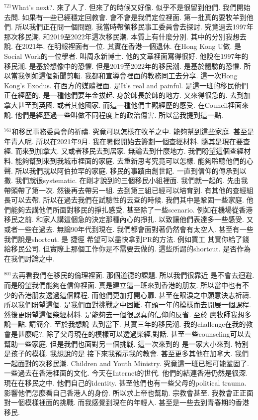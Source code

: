 \documentclass{book}
\begin{document}
$^{721}$What's next?.
來了人了.
但來了的時候又好像.
似乎不是很留到他們.
我們開始去問.
如果有一些已經穩定回教會.
會不會是我們定位裡面.
第一批真的要牧羊到他們.
所以我們正在問一個問題.
我當時帶領移民事工委員會去探討.
究竟過去1997年那次移民潮.
和2019至2022年這次移民潮.
本質上有什麼分別.
其中的分別我想去說.
在2021年.
在明報裡面有一位.
其實在香港一個退休.
在Hong Kong U做.
是Social Work的一位學者.
叫周永新博士.
他的文章裡面寫得很好.
他說在1997年的移民潮.
是基於想像中的恐懼.
但是2019至2022年的移民潮.
是基於體驗的恐懼.
所以當我例如這個新聞剪輯.
我都和宣導會裡面的教務同工去分享.
這一次Hong Kong's Exodus.
在西方的媒體裡面.
是It's real and painful.
是這一班的移民他們正在經歷的.
是一種他們要年金拔起.
身於師長於師的地方.
又來得很急的.
去到加拿大甚至到英國.
或者其他國家.
而這一種他們主觀經歷的感受.
在Council裡面來說.
他們是經歷過一些叫做不同程度上的政治傷害.
所以當我提到這一點.

$^{761}$和移民事務委員會的祈禱.
究竟可以怎樣在牧羊之中.
能夠幫到這些家庭.
甚至是年青人呢.
所以在2021年9月.
我在暑假開始去籌劃一個查經材料.
隨其是現在要查經.
而來到加拿大.
又或者移民去到居家.
無論去到什麼地方.
我們盼望這個查經材料.
能夠幫到來到我城市裡面的家庭.
去重新思考究竟可以怎樣.
能夠聆聽他們的心聲.
所以我們就以阿伯拉罕的家庭.
移民的事蹟由創世記.
一直到信仰的傳承到以撒.
我們就很systematic.
在剛才說到的三個移民小組裡面.
我們就一起的.
先由我帶頭帶了第一次.
然後再去帶另一組.
去到第三組已經可以培育到.
有其他的查經組長可以去帶.
所以在過去我們在試驗性的去查的時候.
我們其中是鞏固一些家庭.
他們能夠去講他們所面對移民的掙扎感受.
甚至除了一些scenario.
例如在機場從香港移民之前.
和家人講這個急的決定那種內心的掙扎.
以致讓他們表達多一些感受.
又或者一些在過去.
無論90年代到現在.
我們都會面對著仍然會有太空人.
甚至有一些我們說是shortcut.
是 捷徑 希望可以盡快拿到PR的方法.
例如買工 其實你給了錢給移民公司.
但實際上那個工作你是不需要去做的.
這些所謂的shortcut.
是否作為在我們討論之中.

$^{801}$去再看我們在移民的倫理裡面.
那個道德的課題.
所以我們很靠近 是不會去迴避.
而是盼望我們能夠在信仰裡面.
真是建立這一班來到香港的朋友.
所以當中也有不少的香港朋友透過這個課程.
而他們更加打開心扉.
甚至在眼淚之中願意決志祈禱.
所以我們盼望這個.
是我們面對挑戰之中困難.
在頭一年的模樣而去開展一個課程.
然後更盼望這個柴經材料.
是能夠去一個很認真的信仰的反省.
至於 盧牧師我想多說一點.
請簡介.
至於我想說 去到當下.
其實三年的移民潮.
我的challenge在我的教會是甚麼呢?.
除了父母現在的模樣可以透過柴經,對話.
甚至一些counseling可以去幫助一些家庭.
但是我們也面對另一個挑戰.
這一次來到的 是一家大小來到.
特別是孩子的模樣.
我想說的是 接下來我預示我的教會.
甚至更多其他在加拿大.
我們一起面對的次移民潮.
Children and Youth Ministry.
究竟這一班已經可能鞏固了.
一些過去在香港裡面的文化.
今天在Internet的世代.
他們的結連香港仍然是很深.
現在在移民之中.
他們自己的identity.
甚至他們也有一些父母的political trauma.
影響他們怎麼看自己香港人的身份.
所以求上帝也幫助.
宗教會甚至.
我教會正正面對一個模樣裡面的挑戰.
而我感覺到現在的年輕人.
甚至是一些去到青春期的香港移民.
\end{document}
